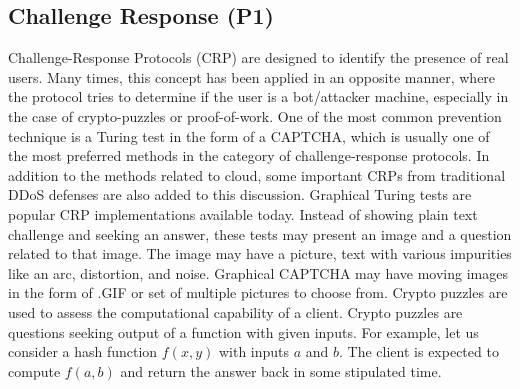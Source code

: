 \documentclass[final,5p,times,twocolumn]{elsarticle}
\begin{document}
\subsection{Challenge Response (P1)}
\label{SectionP1}
\par {Challenge-Response Protocols (CRP) are designed to identify the presence of real users. Many times, this concept has been applied in an opposite manner, where the protocol tries to determine if the user is a bot/attacker machine, especially in the case of crypto-puzzles or proof-of-work. One of the most common prevention technique is a Turing test in the form of a CAPTCHA, which is usually one of the most preferred methods in the category of challenge-response protocols. In addition to the methods related to cloud, some important CRPs from traditional DDoS defenses are also added to this discussion. Graphical Turing tests are popular CRP implementations available today. Instead of showing plain text challenge and seeking an answer, these tests may present an image and a question related to that image. The image may have a picture, text with various impurities like an arc, distortion, and noise. Graphical CAPTCHA may have moving images in the form of .GIF or set of multiple pictures to choose from. Crypto puzzles are used to assess the computational capability of a client. Crypto puzzles are questions seeking output of a function with given inputs. For example, let us consider a hash function $f(x,y)$ with inputs $a$ and $b$. The client is expected to compute $f(a,b)$ and return the answer back in some stipulated time.}
\end{document}

